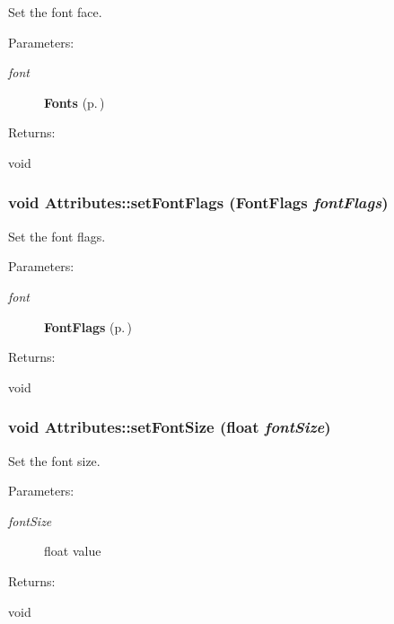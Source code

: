 Set the font face. \begin{Desc}
\item[Parameters: ]\par
\begin{description}
\item[{\em 
font}]{\bf Fonts} {\rm (p.\,\pageref{classAttributes_s76})} \end{description}
\end{Desc}
\begin{Desc}
\item[Returns: ]\par
void \end{Desc}
\subsubsection{\setlength{\rightskip}{0pt plus 5cm}void Attributes::set\-Font\-Flags ({\bf Font\-Flags} {\em font\-Flags})\hspace{0.3cm}{\tt  [inline]}}\label{classAttributes_a20}


Set the font flags. \begin{Desc}
\item[Parameters: ]\par
\begin{description}
\item[{\em 
font}]{\bf Font\-Flags} {\rm (p.\,\pageref{classAttributes_s77})} \end{description}
\end{Desc}
\begin{Desc}
\item[Returns: ]\par
void \end{Desc}
\subsubsection{\setlength{\rightskip}{0pt plus 5cm}void Attributes::set\-Font\-Size (float {\em font\-Size})\hspace{0.3cm}{\tt  [inline]}}\label{classAttributes_a19}


Set the font size. \begin{Desc}
\item[Parameters: ]\par
\begin{description}
\item[{\em 
font\-Size}]float value \end{description}
\end{Desc}
\begin{Desc}
\item[Returns: ]\par
void \end{Desc}

